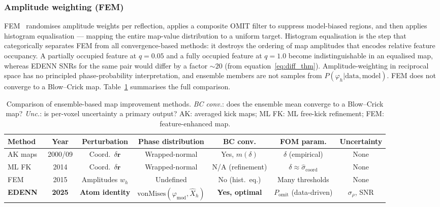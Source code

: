 \documentclass[10pt,twocolumn]{article}
\newcommand{\phimod}{\varphi_{\mathrm{mod}}}
\newcommand{\boldr}{\mathbf{r}}
\begin{document}
\subsubsection{Amplitude weighting (FEM)}

FEM~\cite{afonine2015} randomises amplitude weights per reflection,
applies a composite OMIT filter to suppress model-biased regions,
and then applies histogram equalisation --- mapping the entire
map-value distribution to a uniform target.
Histogram equalisation is the step that categorically separates
FEM from all convergence-based methods: it destroys the ordering
of map amplitudes that encodes relative feature occupancy.
A partially occupied feature at $q = 0.05$ and a fully occupied
feature at $q = 1.0$ become indistinguishable in an equalised map,
whereas EDENN SNRs for the same pair would differ by a factor
$\sim 20$ (from equation~\ref{eq:diff_thm}).
Amplitude-weighting in reciprocal space has no principled
phase-probability interpretation, and ensemble members are not
samples from $P(\varphi_h | \mathrm{data}, \mathrm{model})$.
FEM does not converge to a Blow--Crick map.
Table~\ref{tab:method_comparison} summarises the full comparison.

\begin{table}[t]
\centering
\caption{Comparison of ensemble-based map improvement methods.
\emph{BC conv.}: does the ensemble mean converge to a Blow--Crick
map? \emph{Unc.}: is per-voxel uncertainty a primary output?
AK: averaged kick maps; ML FK: ML free-kick refinement;
FEM: feature-enhanced map.}
\label{tab:method_comparison}
\footnotesize
\begin{tabular}{lcccccc}
\toprule
Method & Year & Perturbation & Phase distribution
       & BC conv. & FOM param. & Uncertainty \\
\midrule
AK maps~\cite{guncar2000,praznk2009}
  & 2000/09 & Coord.\ $\delta\boldr$ & Wrapped-normal
  & Yes, $m(\delta)$ & $\delta$ (empirical) & None \\
ML FK~\cite{praznk2014}
  & 2014 & Coord.\ $\delta\boldr$ & Wrapped-normal
  & N/A (refinement) & $\delta \approx \hat\sigma_\mathrm{coord}$ & None \\
FEM~\cite{afonine2015}
  & 2015 & Amplitudes $w_h$ & Undefined
  & No (hist.\ eq.) & Many thresholds & None \\
\textbf{EDENN}
  & \textbf{2025} & \textbf{Atom identity}
  & $\mathrm{vonMises}(\phimod, \hat{X}_h)$
  & \textbf{Yes, optimal} & $P_\mathrm{omit}$ (data-driven) & $\sigma_\rho$, SNR \\
\bottomrule
\end{tabular}
\end{table}
\end{document}
